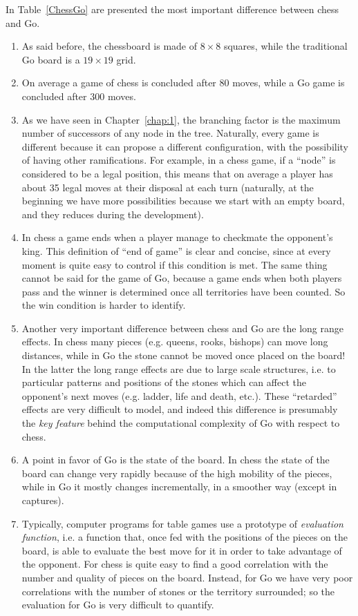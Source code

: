 In Table~\ref{ChessGo} are presented the most important difference between chess and Go.
\begin{enumerate}
\item As said before, the chessboard is made of $8\times8$ squares, while the traditional Go board is a $19\times19$ grid.
\item On average a game of chess is concluded after 80 moves, while a Go game is concluded after 300 moves.
\item As we have seen in Chapter~\ref{chap:1}, the branching factor is the maximum number of successors of any node in the tree. Naturally, every game is different because it can propose a different configuration, with the possibility of having other ramifications. For example, in a chess game, if a ``node'' is considered to be a legal position, this means that on average a player has about 35 legal moves at their disposal at each turn (naturally, at the beginning we have more possibilities because we start with an empty board, and they reduces during the development).
\item In chess a game ends when a player manage to checkmate the opponent's king. This definition of ``end of game'' is clear and concise, since at every moment is quite easy to control if this condition is met. The same thing cannot be said for the game of Go, because a game ends when both players pass and the winner is determined once all territories have been counted. So the win condition is harder to identify.
\item Another very important difference between chess and Go are the long range effects. In chess many pieces (e.g. queens, rooks, bishops) can move long distances, while in Go the stone cannot be moved once placed on the board! In the latter the long range effects are due to large scale structures, i.e. to particular patterns and positions of the stones which can affect the opponent's next moves (e.g. ladder, life and death, etc.). These ``retarded'' effects are very difficult to model, and indeed this difference is presumably the \emph{key feature} behind the computational complexity of Go with respect to chess.
\item A point in favor of Go is the state of the board. In chess the state of the board can change very rapidly because of the high mobility of the pieces, while in Go it mostly changes incrementally, in a smoother way (except in captures).
\item Typically, computer programs for table games use a prototype of \emph{evaluation function}, i.e. a function that, once fed with the positions of the pieces on the board, is able to evaluate the best move for it in order to take advantage of the opponent. For chess is quite easy to find a good correlation with the number and quality of pieces on the board. Instead, for Go we have very poor correlations with the number of stones or the territory surrounded; so the evaluation for Go is very difficult to quantify.

\end{enumerate}
